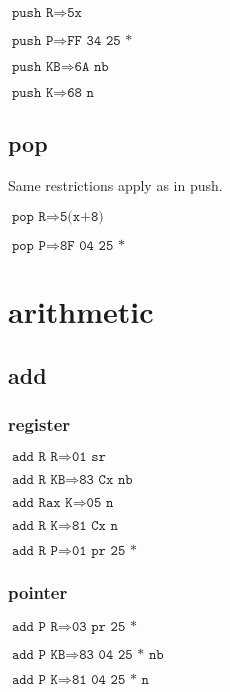 \documentclass{article}
\begin{document}
$\texttt{push R} \Rightarrow \texttt{5x}$

$\texttt{push P} \Rightarrow \texttt{FF 34 25 *}$

$\texttt{push KB} \Rightarrow \texttt{6A nb}$

$\texttt{push K} \Rightarrow \texttt{68 n}$

\subsection{pop}

Same restrictions apply as in push.

$\texttt{pop R} \Rightarrow \texttt{5(x+8)}$

$\texttt{pop P} \Rightarrow \texttt{8F 04 25 *}$


\section{arithmetic}

\subsection{add}
\begin{minipage}{\textwidth}

\subsubsection{register}

$\texttt{add R R} \Rightarrow \texttt{01 sr}$

$\texttt{add R KB} \Rightarrow \texttt{83 Cx nb}$

$\texttt{add Rax K} \Rightarrow \texttt{05 n}$

$\texttt{add R K} \Rightarrow \texttt{81 Cx n}$

$\texttt{add R P} \Rightarrow \texttt{01 pr 25 *}$


\subsubsection{pointer}

$\texttt{add P R} \Rightarrow \texttt{03 pr 25 *}$

$\texttt{add P KB} \Rightarrow \texttt{83 04 25 * nb}$

$\texttt{add P K} \Rightarrow \texttt{81 04 25 * n}$

\end{minipage}
\end{document}
